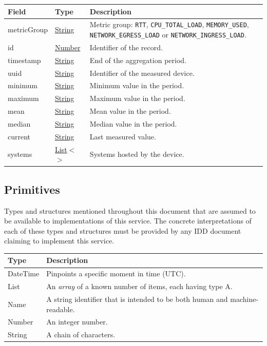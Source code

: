 \documentclass[a4paper]{arrowhead}
\newcommand{\pdef}[1]{{\textcolor{ArrowheadGrey}{#1\label{sec:model:primitives:#1}\label{sec:model:primitives:#1s}\label{sec:model:primitives:#1es}}}}
\newcommand{\pref}[1]{{\textcolor{ArrowheadGrey}{\hyperref[sec:model:primitives:#1]{#1}}}}
\begin{document}
\noindent\begin{tabularx}{\textwidth}{| >{\raggedright\arraybackslash}p{3.9cm} | >{\raggedright\arraybackslash\small}p{5.3cm} | X |} \hline
\rowcolor{gray!33} Field & Type & Description \\ \hline
metric\allowbreak{}Group & \pref{String} & Metric group: \texttt{RTT}, \texttt{CPU\_\allowbreak{}TOTAL\_\allowbreak{}LOAD}, \texttt{MEMORY\_\allowbreak{}USED}, \texttt{NETWORK\_\allowbreak{}EGRESS\_\allowbreak{}LOAD} or \texttt{NETWORK\_\allowbreak{}INGRESS\_\allowbreak{}LOAD}. \\ \hline
id & \pref{Number} & Identifier of the record. \\ \hline
timestamp & \pref{String} & End of the aggregation period. \\ \hline
uuid & \pref{String} & Identifier of the measured device. \\ \hline
minimum & \pref{String} & Minimum value in the period. \\ \hline
maximum & \pref{String} & Maximum value in the period. \\ \hline
mean & \pref{String} & Mean value in the period. \\ \hline
median & \pref{String} & Median value in the period. \\ \hline
current & \pref{String} & Last measured value. \\ \hline
systems & \pref{List}$<$\allowbreak{}\pref{String}$>$ & Systems hosted by the device. \\ \hline
\end{tabularx}



\subsection{Primitives}
\label{sec:model:primitives}

Types and structures mentioned throughout this document that are assumed to be available to implementations of this service.
The concrete interpretations of each of these types and structures must be provided by any IDD document claiming to implement this service.

\noindent\begin{tabularx}{\textwidth}{| p{4.6cm} | X |} \hline
\rowcolor{gray!33} Type & Description \\ \hline
\pdef{DateTime} & Pinpoints a specific moment in time (UTC). \\ \hline
\pdef{List} & An \textit{array} of a known number of items, each having type A. \\ \hline
\pdef{Name} & A string identifier that is intended to be both human and machine-readable. \\ \hline
\pdef{Number} & An integer number. \\ \hline
\pdef{String} & A chain of characters. \\ \hline
\end{tabularx}
\end{document}
